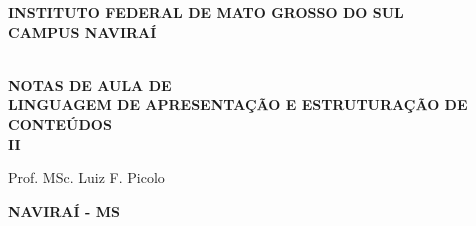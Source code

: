 \thispagestyle{empty}

\vfill
 \begin{center}
    
    {\large\bfseries INSTITUTO FEDERAL DE MATO GROSSO DO SUL} \\
    
    {\large\bfseries CAMPUS NAVIRAÍ}  \\ 

    \vspace*{1in}

    \vspace*{4cm}
    \noindent \\
    
    \large\bfseries{NOTAS DE AULA DE} \\
    \huge\bfseries{LINGUAGEM DE APRESENTAÇÃO E ESTRUTURAÇÃO DE CONTEÚDOS} \\ II
    
    \vspace*{4cm}
    
    \large{Prof. MSc. Luiz F. Picolo}
    
    \vfill
    \large\bfseries{NAVIRAÍ - MS}
\end{center}

\normalsize


